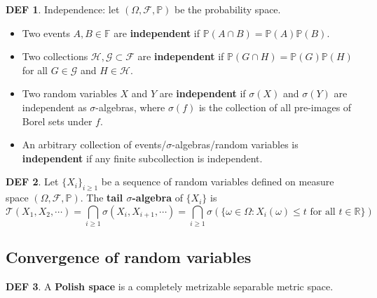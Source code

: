 \documentclass[hidelinks,11pt]{article}
\theoremstyle{definition}
\newtheorem*{defin}{DEF}
\theoremstyle{dotless}
\theoremstyle{remark}
\DeclareMathOperator{\1}{\mathbf{1}}
\begin{document}
\begin{defin}
Independence: let $(\Omega,\mathcal{F},\mathbb{P})$ be the probability space.\begin{itemize}
    \item Two events $A,B\in\mathbb{F}$ are \textbf{independent} if $\mathbb{P}(A\cap B)=\mathbb{P}(A)\mathbb{P}(B)$.
    \item Two collections $\mathcal{H},\mathcal{G}\subset\mathcal{F}$ are \textbf{independent} if $\mathbb{P}(G\cap H)=\mathbb{P}(G)\mathbb{P}(H)$ for all $G\in\mathcal{G}$ and $H\in\mathcal{H}$.
    \item Two random variables $X$ and $Y$ are \textbf{independent} if $\sigma(X)$ and $\sigma(Y)$ are independent as $\sigma$-algebras, where $\sigma(f)$ is the collection of all pre-images of Borel sets under $f$.
    \item An arbitrary collection of events/$\sigma$-algebras/random variables is \textbf{independent} if any finite subcollection is independent.
\end{itemize}
\end{defin}

\begin{defin}
Let $\{X_i\}_{i\geq1}$ be a sequence of random variables defined on measure space $(\Omega,\mathcal{F},\mathbb{P})$. The \textbf{tail $\sigma$-algebra} of $\{X_i\}$ is
\[\mathcal{T}(X_1,X_2,\cdots)=\bigcap_{i\geq1}\sigma(X_i,X_{i+1},\cdots)=\bigcap_{i\geq1}\sigma(\{\omega\in\Omega:X_i(\omega)\leq t\textrm{ for all }t\in\mathbb{R}\})\]
\end{defin}

\subsection{Convergence of random variables}

\begin{defin}
A \textbf{Polish space} is a completely metrizable separable metric space.
\end{defin}
\end{document}
